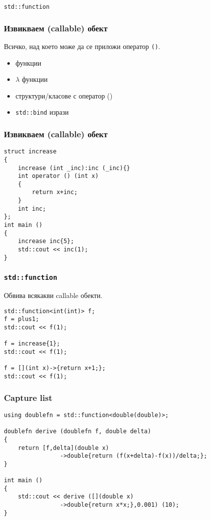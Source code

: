 \documentclass{beamer}
\begin{document}
\begin{frame}
    \centerline{\texttt{std::function}}
\end{frame}


\begin{frame}[fragile]
\frametitle{Извикваем (callable) обект}

Всичко, над което може да се приложи оператор \texttt{()}.

\begin{itemize}
    \item функции
    \item $\lambda$ функции
    \item структури/класове с оператор ()
    \item \texttt{std::bind} изрази
\end{itemize}

\end{frame}

\begin{frame}[fragile]
    \frametitle{Извикваем (callable) обект}

\begin{lstlisting}[basicstyle=\small]
struct increase
{
    increase (int _inc):inc (_inc){}
    int operator () (int x)
    {
        return x+inc;
    }
    int inc;
};
int main ()
{
    increase inc{5};
    std::cout << inc(1);
}    
\end{lstlisting}    
\end{frame}
    

\begin{frame}[fragile]
    \frametitle{\texttt{std::function}}

Обвива всякакви callable обекти.
\bigskip

\begin{lstlisting}[basicstyle=\small]
std::function<int(int)> f;
f = plus1; 
std::cout << f(1);

f = increase{1}; 
std::cout << f(1);

f = [](int x)->{return x+1;}; 
std::cout << f(1);
\end{lstlisting}    
\end{frame}



\begin{frame}[fragile]
    \frametitle{Capture list}
    
\begin{lstlisting}[basicstyle=\small]
using doublefn = std::function<double(double)>;

doublefn derive (doublefn f, double delta)
{ 
    return [f,delta](double x)
                ->double{return (f(x+delta)-f(x))/delta;};
}

int main ()
{
    std::cout << derive ([](double x)
                ->double{return x*x;},0.001) (10);
}
\end{lstlisting}
\end{frame}
\end{document}
